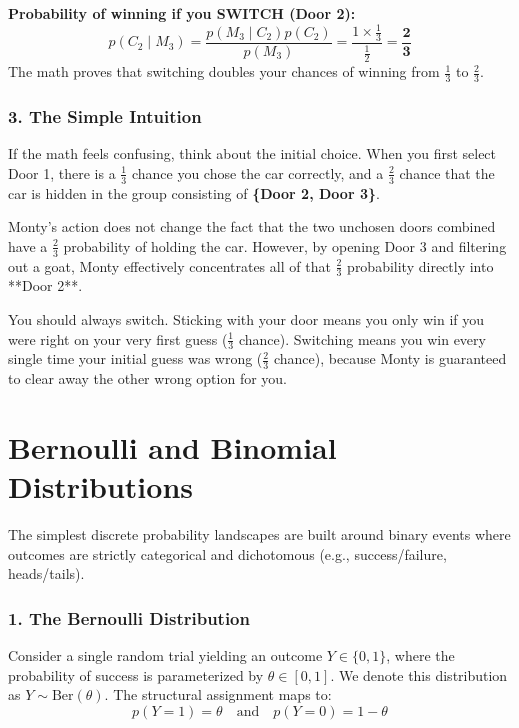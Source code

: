 \documentclass{article}
\begin{document}
\noindent \textbf{Probability of winning if you SWITCH (Door 2):}
\begin{equation}
    p(C_2 \mid M_3) = \frac{p(M_3 \mid C_2)p(C_2)}{p(M_3)} = \frac{1 \times \frac{1}{3}}{\frac{1}{2}} = \mathbf{\frac{2}{3}}
\end{equation}
The math proves that switching doubles your chances of winning from $\frac{1}{3}$ to $\frac{2}{3}$.

\subsubsection*{3. The Simple Intuition}
If the math feels confusing, think about the initial choice. When you first select Door 1, there is a $\frac{1}{3}$ chance you chose the car correctly, and a $\frac{2}{3}$ chance that the car is hidden in the group consisting of \textbf{\{Door 2, Door 3\}}.

Monty's action does not change the fact that the two unchosen doors combined have a $\frac{2}{3}$ probability of holding the car. However, by opening Door 3 and filtering out a goat, Monty effectively concentrates all of that $\frac{2}{3}$ probability directly into **Door 2**. 

\begin{tcolorbox}[colback=green!5!white, colframe=green!60!black, title=Intuitive Takeaway]
You should always switch. Sticking with your door means you only win if you were right on your very first guess ($\frac{1}{3}$ chance). Switching means you win every single time your initial guess was wrong ($\frac{2}{3}$ chance), because Monty is guaranteed to clear away the other wrong option for you.
\end{tcolorbox}

\section*{Bernoulli and Binomial Distributions}

The simplest discrete probability landscapes are built around binary events where outcomes are strictly categorical and dichotomous (e.g., success/failure, heads/tails).

\subsubsection*{1. The Bernoulli Distribution}
Consider a single random trial yielding an outcome $Y \in \{0, 1\}$, where the probability of success is parameterized by $\theta \in [0,1]$. We denote this distribution as $Y \sim \text{Ber}(\theta)$. The structural assignment maps to:
\begin{equation}
    p(Y=1) = \theta \quad \text{and} \quad p(Y=0) = 1 - \theta
\end{equation}
\end{document}
